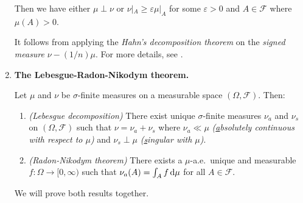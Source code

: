 \begin{enumerate}
\begin{lemma}
Then we have either \(\mu\perp\nu\) or \(\nu|_{A}\ge\varepsilon\mu|_{A}\) for
some \(\varepsilon>0\) and \(A\in\mathcal{F}\) where \(\mu(A)>0\).
\end{lemma}
\begin{pf}
It follows from applying the \emph{Hahn's decomposition theorem}
\parencite[Theorem~3.3]{folland1999real} on the \emph{signed measure}
\(\nu-(1/n)\mu\). For more details, see \textcite[Lemma~3.7]{folland1999real}.
\end{pf}
\item \textbf{The Lebesgue-Radon-Nikodym theorem.}
\begin{theorem}
\label{thm:leb-rn}
Let \(\mu\) and \(\nu\) be \(\sigma\)-finite measures on a measurable space
\((\Omega,\mathcal{F})\). Then:
\begin{enumerate}
\item \emph{(Lebesgue decomposition)} There exist unique \(\sigma\)-finite
measures \(\nu_a\) and \(\nu_s\) on \((\Omega,\mathcal{F})\) such that
\(\nu=\nu_a+\nu_s\) where \(\nu_a\ll\mu\) \emph{(\underline{a}bsolutely
continuous with respect to \(\mu\))} and \(\nu_s\perp\mu\) \emph{(\underline{s}ingular with \(\mu\))}.
\item \emph{(Radon-Nikodym theorem)} There exists a \(\mu\)-a.e.\ unique and
measurable \(f:\Omega\to[0,\infty)\) such that
\(\nu_a(A)=\int_{A}^{}f\odif{\mu}\) for all \(A\in\mathcal{F}\).

\end{enumerate}
\end{theorem}
\begin{pf}
We will prove both results together.

\end{pf}
\end{enumerate}
